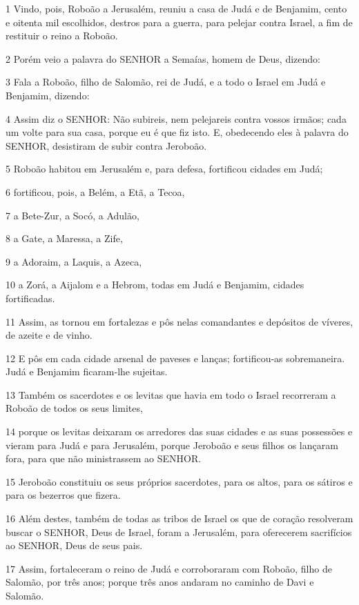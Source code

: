 \par 1 Vindo, pois, Roboão a Jerusalém, reuniu a casa de Judá e de Benjamim, cento e oitenta mil escolhidos, destros para a guerra, para pelejar contra Israel, a fim de restituir o reino a Roboão.
\par 2 Porém veio a palavra do SENHOR a Semaías, homem de Deus, dizendo:
\par 3 Fala a Roboão, filho de Salomão, rei de Judá, e a todo o Israel em Judá e Benjamim, dizendo:
\par 4 Assim diz o SENHOR: Não subireis, nem pelejareis contra vossos irmãos; cada um volte para sua casa, porque eu é que fiz isto. E, obedecendo eles à palavra do SENHOR, desistiram de subir contra Jeroboão.
\par 5 Roboão habitou em Jerusalém e, para defesa, fortificou cidades em Judá;
\par 6 fortificou, pois, a Belém, a Etã, a Tecoa,
\par 7 a Bete-Zur, a Socó, a Adulão,
\par 8 a Gate, a Maressa, a Zife,
\par 9 a Adoraim, a Laquis, a Azeca,
\par 10 a Zorá, a Aijalom e a Hebrom, todas em Judá e Benjamim, cidades fortificadas.
\par 11 Assim, as tornou em fortalezas e pôs nelas comandantes e depósitos de víveres, de azeite e de vinho.
\par 12 E pôs em cada cidade arsenal de paveses e lanças; fortificou-as sobremaneira. Judá e Benjamim ficaram-lhe sujeitas.
\par 13 Também os sacerdotes e os levitas que havia em todo o Israel recorreram a Roboão de todos os seus limites,
\par 14 porque os levitas deixaram os arredores das suas cidades e as suas possessões e vieram para Judá e para Jerusalém, porque Jeroboão e seus filhos os lançaram fora, para que não ministrassem ao SENHOR.
\par 15 Jeroboão constituiu os seus próprios sacerdotes, para os altos, para os sátiros e para os bezerros que fizera.
\par 16 Além destes, também de todas as tribos de Israel os que de coração resolveram buscar o SENHOR, Deus de Israel, foram a Jerusalém, para oferecerem sacrifícios ao SENHOR, Deus de seus pais.
\par 17 Assim, fortaleceram o reino de Judá e corroboraram com Roboão, filho de Salomão, por três anos; porque três anos andaram no caminho de Davi e Salomão.
